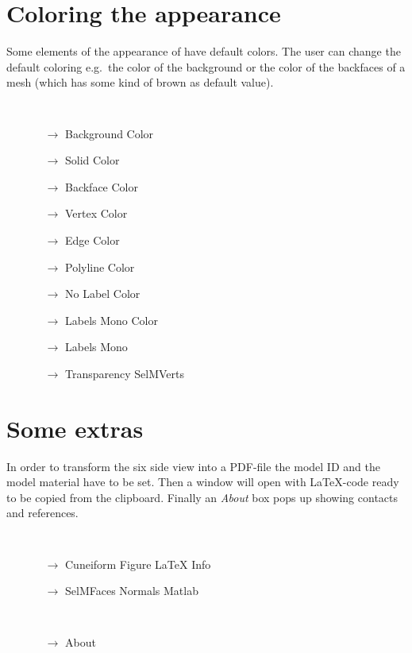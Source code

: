 \section{Coloring the appearance}\label{displaycolor} 
Some elements of the appearance of \GigaMesh have default colors. The user can change the default coloring e.g.~the color of the background or the color of the backfaces of a mesh (which has  some kind of brown as default value).
{\tt
\begin{itemize}
\item[] 
  \begin{itemize}
 \item[$\rightarrow$] Background Color
 \item[$\rightarrow$] Solid Color
 \item[$\rightarrow$] Backface Color
 \item[$\rightarrow$] Vertex Color
 \item[$\rightarrow$] Edge Color
 \item[$\rightarrow$] Polyline Color
 \item[$\rightarrow$] No Label Color
 \item[$\rightarrow$] Labels Mono Color
 \item[$\rightarrow$] Labels Mono
 \item[$\rightarrow$] Transparency SelMVerts
  \end{itemize}
 \end{itemize}
 }

\section{Some extras}\label{extras} 
In order to transform the six side view into a PDF-file the model ID and the model material have to be set. Then a window will open with \LaTeX-code ready to be copied from the clipboard. Finally an {\em About} box pops up showing contacts and references.
{\tt
\begin{itemize}
\item[] 
  \begin{itemize}
  \item[$\rightarrow$] Cuneiform Figure LaTeX Info
  \item[$\rightarrow$] SelMFaces Normals Matlab
  \end{itemize}
\end{itemize}
}
{\tt
\begin{itemize}
\item[] 
  \begin{itemize}
  \item[$\rightarrow$] About
  \end{itemize}
\end{itemize}
}

